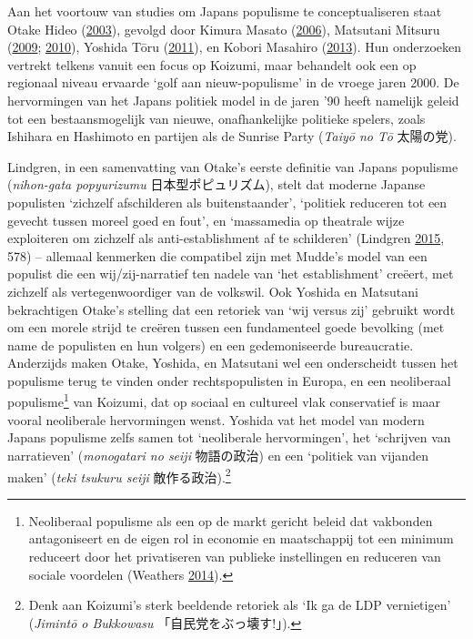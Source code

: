 \documentclass[10.5pt,dutch,]{article}
\begin{document}
Aan het voortouw van studies om Japans populisme te conceptualiseren
staat Otake Hideo
(\protect\hyperlink{ref-otakeux5fnihonux5f2003}{2003}), gevolgd door
Kimura Masato
(\protect\hyperlink{ref-kimuraux5fpopyurizumuux5f2006}{2006}), Matsutani
Mitsuru (\protect\hyperlink{ref-matsutaniux5fwakamonoux5f2009}{2009};
\protect\hyperlink{ref-matsutaniux5fnihon-gataux5f2010}{2010}), Yoshida
Tōru (\protect\hyperlink{ref-yoshidaux5fpopyurizumuux5f2011}{2011}), en
Kobori Masahiro
(\protect\hyperlink{ref-koboriux5fpopulismux5f2013}{2013}). Hun
onderzoeken vertrekt telkens vanuit een focus op Koizumi, maar behandelt
ook een op regionaal niveau ervaarde `golf aan nieuw-populisme' in de
vroege jaren 2000. De hervormingen van het Japans politiek model in de
jaren '90 heeft namelijk geleid tot een bestaansmogelijk van nieuwe,
onafhankelijke politieke spelers, zoals Ishihara en Hashimoto en
partijen als de Sunrise Party (\emph{Taiyō no Tō} 太陽の党).

Lindgren, in een samenvatting van Otake's eerste definitie van Japans
populisme (\emph{nihon-gata popyurizumu} 日本型ポピュリズム), stelt dat
moderne Japanse populisten `zichzelf afschilderen als buitenstaander',
`politiek reduceren tot een gevecht tussen moreel goed en fout', en
`massamedia op theatrale wijze exploiteren om zichzelf als
anti-establishment af te schilderen' (Lindgren
\protect\hyperlink{ref-lindgrenux5fdevelopingux5f2015}{2015}, 578) --
allemaal kenmerken die compatibel zijn met Mudde's model van een
populist die een wij/zij-narratief ten nadele van `het establishment'
creëert, met zichzelf als vertegenwoordiger van de volkswil. Ook Yoshida
en Matsutani bekrachtigen Otake's stelling dat een retoriek van `wij
versus zij' gebruikt wordt om een morele strijd te creëren tussen een
fundamenteel goede bevolking (met name de populisten en hun volgers) en
een gedemoniseerde bureaucratie. Anderzijds maken Otake, Yoshida, en
Matsutani wel een onderscheidt tussen het populisme terug te vinden
onder rechtspopulisten in Europa, en een neoliberaal populisme\footnote{Neoliberaal
  populisme als een op de markt gericht beleid dat vakbonden
  antagoniseert en de eigen rol in economie en maatschappij tot een
  minimum reduceert door het privatiseren van publieke instellingen en
  reduceren van sociale voordelen (Weathers
  \protect\hyperlink{ref-weathersux5freformerux5f2014}{2014}).} van
Koizumi, dat op sociaal en cultureel vlak conservatief is maar vooral
neoliberale hervormingen wenst. Yoshida vat het model van modern Japans
populisme zelfs samen tot `neoliberale hervormingen', het `schrijven van
narratieven' (\emph{monogatari no seiji} 物語の政治) en een `politiek
van vijanden maken' (\emph{teki tsukuru seiji} 敵作る政治).\footnote{Denk
  aan Koizumi's sterk beeldende retoriek als `Ik ga de LDP vernietigen'
  (\emph{Jimintō o Bukkowasu} 「自民党をぶっ壊す!」).}
\end{document}
